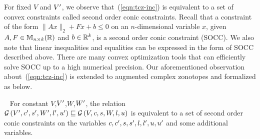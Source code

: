For fixed $V$ and $V^\prime$, we observe that~(\ref{eqn:tcz-inc}) is
equivalent to a set of convex constraints called second order
conic constraints.
%
Recall that a constraint of the form $\|Ax\|_{2}+Fx+b\leq 0$ on an $n$-dimensional
variable $x$, given $A,F\in\mathbb{M}_{n\times k}(\mathbb{\mathbb{R}})$ and $b\in\mathbb{R}^k$, is
a second order conic constraint (SOCC).
%
We also note that linear inequalities and equalities can be expressed
in the form of SOCC described above. There are many convex optimization tools that can efficiently solve
SOCC up to a high numerical precision. Our aforementioned observation
about~(\ref{eqn:tcz-inc}) is extended to augmented
complex zonotopes and formalized as below.
%
\begin{proposition}~\label{lem:zon-socc}
For constant $V$,$V^\prime$,$W$,$W^\prime$, the relation\\
$\mathcal{G}\left(V^\prime,c^\prime,s^\prime,W^\prime,l^\prime,u^\prime\right)\sqsubseteq \mathcal{G}\left(V,c,s,W,l,u\right)$ is equivalent to a set of second order conic constraints on
the variables $c,c^\prime,s,s^\prime,l,l^\prime,u,u^\prime$ and some additional
variables.
\end{proposition}
%













